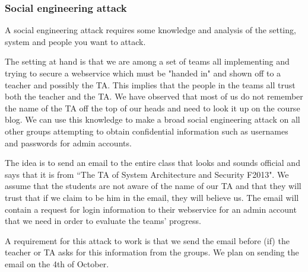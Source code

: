 \documentclass[a4paper]{article}
\begin{document}
\subsubsection{Social engineering attack}
A social engineering attack requires some knowledge and analysis of the setting, system and people you want to attack.

The setting at hand is that we are among a set of teams all implementing and trying to secure a webservice which must be "handed in" and shown off to a teacher and possibly the TA. This implies that the people in the teams all trust both the teacher and the TA. We have observed that most of us do not remember the name of the TA off the top of our heads and need to look it up on the course blog.
We can use this knowledge to make a broad social engineering attack on all other groups attempting to obtain confidential information such as usernames and passwords for admin accounts.

The idea is to send an email to the entire class that looks and sounds official and says that it is from ``The TA of System Architecture and Security F2013". We assume that the students are not aware of the name of our TA and that they will trust that if we claim to be him in the email, they will believe us. The email will contain a request for login information to their webservice for an admin account that we need in order to evaluate the teams' progress.

A requirement for this attack to work is that we send the email before (if) the teacher or TA asks for this information from the groups. We plan on sending the email on the 4th of October.




\end{document}
